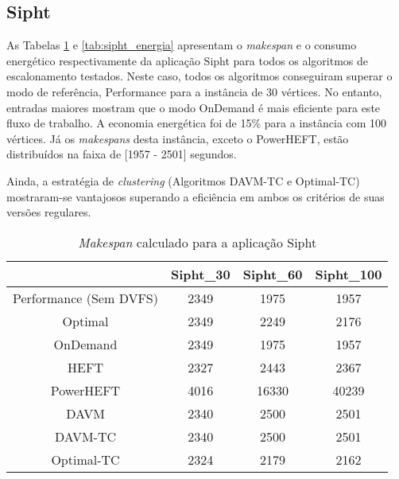 \subsection{Sipht}
\label{sec:sipht}

As Tabelas \ref{tab:sipht_tempo} e \ref{tab:sipht_energia} apresentam o
\emph{makespan} e o consumo energético respectivamente da aplicação Sipht para
todos os algoritmos de escalonamento testados. Neste caso, todos os algoritmos
conseguiram superar o modo de referência, Performance para a instância de 30
vértices. No entanto, entradas maiores mostram que o modo OnDemand é mais
eficiente para este fluxo de trabalho. A economia energética foi de 15\% para a
instância com 100 vértices. Já os \emph{makespans} desta instância, exceto o
PowerHEFT, estão distribuídos na faixa de [1957 - 2501] segundos.

Ainda, a estratégia de \emph{clustering} (Algoritmos DAVM-TC e Optimal-TC)
mostraram-se vantajosos superando a eficiência em ambos os critérios de suas
versões regulares.

\begin{table}
	\centering
    \begin{tabular}{c|ccc}
    ~                    & Sipht\_30 & Sipht\_60 & Sipht\_100 \\ \hline
    Performance (Sem DVFS)                              & 2349     & 1975     & 1957      \\
    \cite{guerout:energy_aware_simulation} Optimal      & 2349     & 2249     & 2176      \\
    \cite{guerout:energy_aware_simulation} OnDemand     & 2349     & 1975     & 1957      \\
    HEFT                                                & 2327     & 2443     & 2367      \\
    PowerHEFT                                           & 4016     & 16330    & 40239     \\
    DAVM                                                & 2340     & 2500     & 2501      \\
    DAVM-TC                                             & 2340     & 2500     & 2501      \\
    Optimal-TC                                          & 2324     & 2179     & 2162      \\
    \end{tabular}
    \caption{\emph{Makespan} calculado para a aplicação Sipht}
    \label{tab:sipht_tempo}
\end{table}



